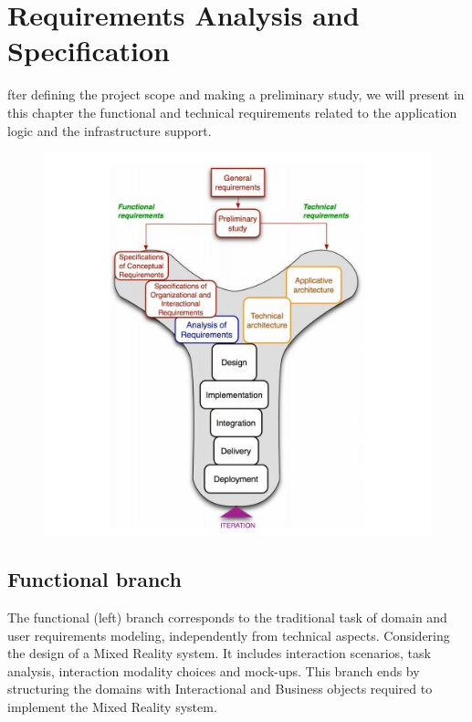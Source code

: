 %
%
\let\textcircled=\pgftextcircled
\chapter{Requirements Analysis and Specification}
\label{chap:intro}

fter defining the project scope and making a preliminary study, we will present in this chapter 
the functional and technical requirements related to the application logic and the infrastructure support.
\begin{figure}[h!]
	\centering
	\includegraphics[height=0.4\textheight]{fig01/Capture}
	\label{fig:FilialesEtClients}
\end{figure}
\section{Functional branch}
\label{sec:sec01}
The functional (left) branch corresponds to the traditional task of domain and
user requirements modeling, independently from technical aspects. Considering
the design of a Mixed Reality system. It includes interaction scenarios, task analysis, 
interaction modality choices and mock-ups. This branch ends by structuring the domains with
Interactional and Business objects required to implement the Mixed Reality
system.
